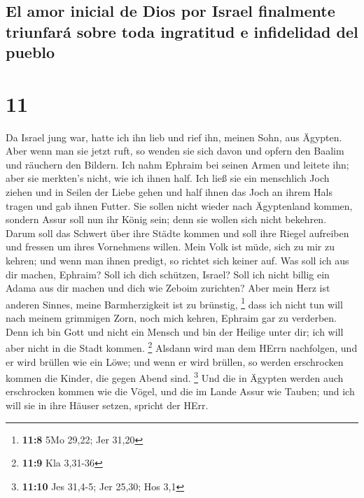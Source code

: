 \hypertarget{el-amor-inicial-de-dios-por-israel-finalmente-triunfaruxe1-sobre-toda-ingratitud-e-infidelidad-del-pueblo}{%
\subsection{El amor inicial de Dios por Israel finalmente triunfará
sobre toda ingratitud e infidelidad del
pueblo}\label{el-amor-inicial-de-dios-por-israel-finalmente-triunfaruxe1-sobre-toda-ingratitud-e-infidelidad-del-pueblo}}

\hypertarget{section-10}{%
\section{11}\label{section-10}}

 Da Israel jung war, hatte ich ihn lieb und rief ihn,
meinen Sohn, aus Ägypten.  Aber wenn man sie jetzt ruft,
so wenden sie sich davon und opfern den Baalim und räuchern den Bildern.
 Ich nahm Ephraim bei seinen Armen und leitete ihn; aber
sie merkten's nicht, wie ich ihnen half.  Ich ließ sie ein
menschlich Joch ziehen und in Seilen der Liebe gehen und half ihnen das
Joch an ihrem Hals tragen und gab ihnen Futter.  Sie
sollen nicht wieder nach Ägyptenland kommen, sondern Assur soll nun ihr
König sein; denn sie wollen sich nicht bekehren.  Darum
soll das Schwert über ihre Städte kommen und soll ihre Riegel aufreiben
und fressen um ihres Vornehmens willen.  Mein Volk ist
müde, sich zu mir zu kehren; und wenn man ihnen predigt, so richtet sich
keiner auf.  Was soll ich aus dir machen, Ephraim? Soll
ich dich schützen, Israel? Soll ich nicht billig ein Adama aus dir
machen und dich wie Zeboim zurichten? Aber mein Herz ist anderen Sinnes,
meine Barmherzigkeit ist zu brünstig, \footnote{\textbf{11:8} 5Mo 29,22;
  Jer 31,20}  dass ich nicht tun will nach meinem
grimmigen Zorn, noch mich kehren, Ephraim gar zu verderben. Denn ich bin
Gott und nicht ein Mensch und bin der Heilige unter dir; ich will aber
nicht in die Stadt kommen. \footnote{\textbf{11:9} Kla 3,31-36}
 Alsdann wird man dem HErrn nachfolgen, und er wird
brüllen wie ein Löwe; und wenn er wird brüllen, so werden erschrocken
kommen die Kinder, die gegen Abend sind. \footnote{\textbf{11:10} Jes
  31,4-5; Jer 25,30; Hos 3,1}  Und die in Ägypten werden
auch erschrocken kommen wie die Vögel, und die im Lande Assur wie
Tauben; und ich will sie in ihre Häuser setzen, spricht der HErr.

